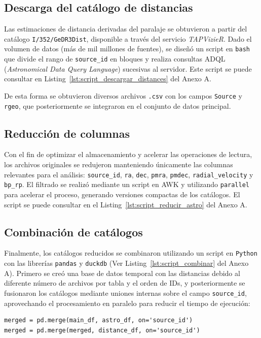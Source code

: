 \subsection*{Descarga del catálogo de distancias}

Las estimaciones de distancia derivadas del paralaje se obtuvieron a partir del catálogo \texttt{I/352/GeDR3Dist}, disponible a través del servicio \textit{TAPVizieR}.
Dado el volumen de datos (más de mil millones de fuentes), se diseñó un script en \texttt{bash} que divide el rango de \texttt{source\_id} en bloques y realiza consultas ADQL (\textit{Astronomical Data Query Language}) sucesivas al servidor.
Este script se puede consultar en Listing~\ref{lst:script_descargar_distances} del Anexo A.

De esta forma se obtuvieron diversos archivos \texttt{.csv} con los campos \texttt{Source} y \texttt{rgeo}, que posteriormente se integraron en el conjunto de datos principal.
\subsection*{Reducción de columnas}

Con el fin de optimizar el almacenamiento y acelerar las operaciones de lectura, los archivos originales se redujeron manteniendo únicamente las columnas relevantes para el análisis:
\texttt{source\_id}, \texttt{ra}, \texttt{dec}, \texttt{pmra}, \texttt{pmdec}, \texttt{radial\_velocity} y \texttt{bp\_rp}.
El filtrado se realizó mediante un script en AWK y utilizando \texttt{parallel} para acelerar el proceso, generando versiones compactas de los catálogos.
El script se puede consultar en el Listing~\ref{lst:script_reducir_astro} del Anexo A.
\subsection*{Combinación de catálogos}

Finalmente, los catálogos reducidos se combinaron utilizando un script en \texttt{Python} con las librerías \texttt{pandas} y \texttt{duckdb} (Ver Listing~\ref{lst:script_combinar} del Anexo A).
Primero se creó una base de datos temporal con las distancias debido al diferente número de archivos por tabla y el orden de IDs, y posteriormente se fusionaron los catálogos mediante uniones internas sobre el campo \texttt{source\_id}, aprovechando el procesamiento en paralelo para reducir el tiempo de ejecución:

\begin{verbatim}
merged = pd.merge(main_df, astro_df, on='source_id')
merged = pd.merge(merged, distance_df, on='source_id')
\end{verbatim}


